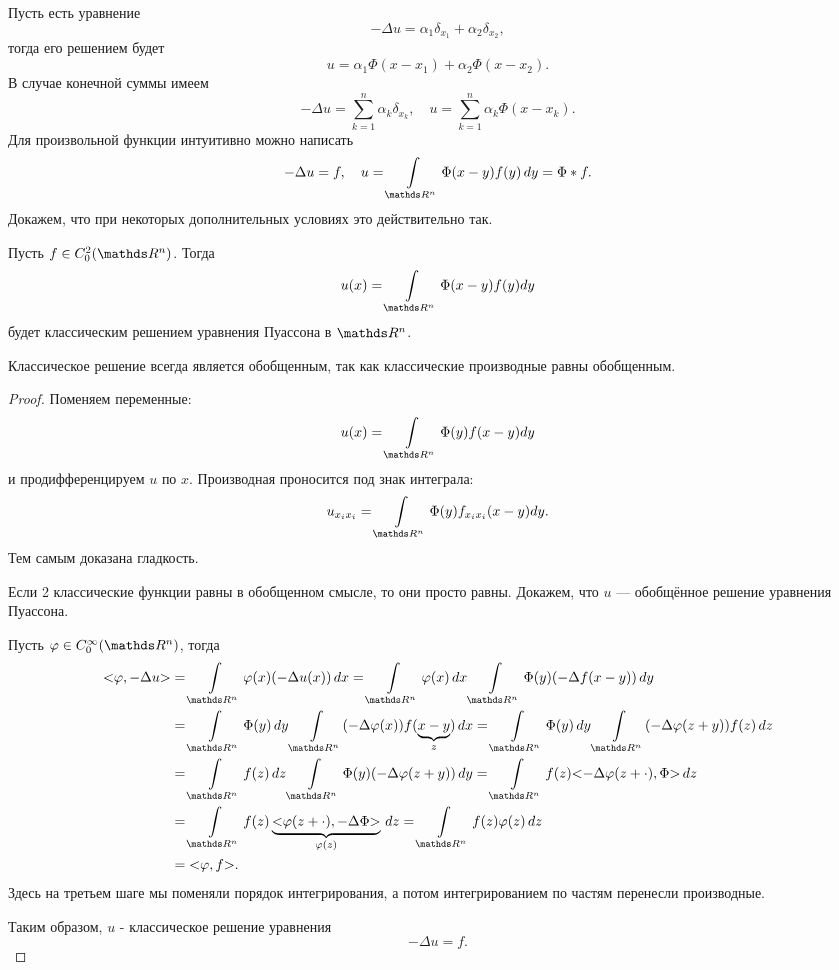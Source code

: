 Пусть есть уравнение
$$ - \Delta u = \alpha_1 \delta_{x_1} + \alpha_2 \delta_{x_2},$$
тогда его решением будет
$$ u = \alpha_1 \Phi (x - x_1) + \alpha_2 \Phi (x - x_2).$$
В случае конечной суммы имеем
$$ - \Delta u = \sum_{k = 1}^n \alpha_k \delta_{x_k}, \quad u = \sum_{k=1}^n \alpha_k \Phi (x - x_k).$$
Для произвольной функции интуитивно можно написать
$$-\Delta u = f, \quad u = \int \limits_{\real^n} \Phi(x-y) f(y) \, dy = \Phi*f.$$
Докажем, что при некоторых дополнительных условиях это действительно так.
\begin{theorem}
Пусть $f\in C_0^2(\real^n)$. Тогда
$$ u(x) = \int\limits_{\real^n} \Phi(x-y)f(y)dy$$ будет классическим решением уравнения Пуассона в $\real^n$. 
\begin{note} Классическое решение всегда является обобщенным, так как классические производные равны обобщенным.
\end{note}
\end{theorem}
\begin{proof} Поменяем переменные:
$$u(x) = \int\limits_{\real^n}\Phi(y)f(x-y)dy$$
и продифференцируем $u$ по $x$. Производная проносится под знак интеграла:
$$u_{x_ix_i}=\int\limits_{\real^n}\Phi(y)f_{x_ix_i}(x-y)dy.$$
Тем самым доказана гладкость.

Если 2 классические функции равны в обобщенном смысле, то они просто равны. Докажем, что $u$ --- обобщённое решение уравнения Пуассона.

Пусть $\varphi\in C_0^\infty(\real^n)$, тогда
\begin{align*}
\action{\varphi, -\Delta u} &= \int \limits_{\real^n} \varphi(x)(-\Delta u(x)) \, dx = \int \limits_{\real^n}\varphi(x) \, dx \int \limits_{\real^n} \Phi(y)(-\Delta f(x-y)) \, dy \\
&= \int \limits_{\real^n} \Phi(y) \, dy \int \limits_{\real^n} (-\Delta\varphi(x)) f(\underbrace{x-y}_z) \, dx = \int \limits_{\real^n} \Phi(y) \, dy \int \limits_{\real^n} (-\Delta\varphi(z+y)) f(z) \, dz \\
&= \int \limits_{\real^n} f(z) \, dz \int \limits_{\real^n} \Phi(y) (-\Delta\varphi(z+y)) \, dy = \int \limits_{\real^n} f(z) \action{-\Delta\varphi(z+\cdot), \Phi} \, dz \\
&= \int \limits_{\real^n} f(z) \underbrace{\action{\varphi(z+\cdot), -\Delta\Phi}}_{\varphi(z)} \, dz = \int\limits_{\real^n} f(z) \varphi(z) \, dz \\
& = \action{\varphi, f}.
\end{align*}
Здесь на третьем шаге мы поменяли порядок интегрирования, а потом интегрированием по частям перенесли производные.

Таким образом, $u$ - классическое решение уравнения $$-\Delta u = f.$$
\end{proof}